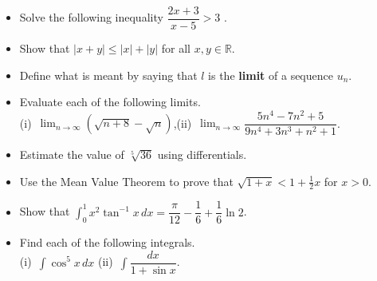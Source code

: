 \documentclass[12pt]{uz-exame}
\begin{document}
 
\rubric{\science}
\makeheading
\sectionAscience
\begin{question}
\begin{itemize}
\item[(a)] Solve the following inequality $\dfrac{2x+3}{x-5}>3$ .
\item[(b)] Show that $|x+y|\leq |x|+|y|$ for all $x,y\in \mathbb{R}$.
\end{itemize}
\end{question}
\begin{question}
\begin{itemize}
\item[(a)] Define what is meant by saying that $l$ is the \textbf{limit} of a sequence $u_n$. 
\item[(b)] Evaluate each of the following limits.\\
(i)\, $\displaystyle \lim _{n\rightarrow \infty}(\sqrt{n+8}-\sqrt{n})$,\quad  \quad (ii)\, $\displaystyle \lim _{n\rightarrow \infty} \dfrac{5n^4-7n^2+5}{9n^4+3n^3+n^2+1}$.  
\end{itemize}
\end{question}
\begin{question}
\begin{itemize}
\item[(a)] Estimate the value of $\sqrt[5]{36}$ using differentials. 
\item[(b)] Use the Mean Value Theorem to prove that $\sqrt{1+x}<1+\frac{1}{2}x$ for $x>0$.
\end{itemize}
\end{question}
\begin{question}
\begin{itemize}
\item[(a)] Show that $\displaystyle \int _0^1 x^2\tan ^{-1} x\, dx =\dfrac{\pi}{12}-\dfrac{1}{6}+\dfrac{1}{6}\ln 2$. 
\item[(b)] Find each of the following integrals.\\
(i)\, $\displaystyle \int \cos ^5 x\, dx$ \quad \quad \quad (ii)\, $\displaystyle \int \dfrac{dx}{1+\sin x}$. 
\end{itemize}
\end{question}
\newpage
\sectionBscience
\end{document}
